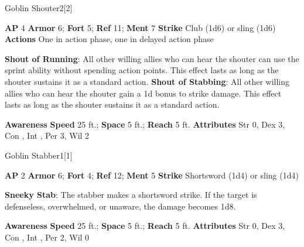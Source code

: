 \begin{monsection}{Goblin Shouter}{2}[2]
\vspace{-1em}\vspace{-1em}
\begin{spellcontent}
\begin{spelltargetinginfo}
{\textbf{AP} 4}
\pari \textbf{Armor} 6;
\textbf{Fort} 5;
\textbf{Ref} 11;
\textbf{Ment} 7
\pari \textbf{Strike} Club  (1d6) or sling  (1d6)
\pari \textbf{Actions} One in action phase, one in delayed action phase
\end{spelltargetinginfo}
\begin{spelleffects}
\pari
\textbf{Shout of Running}:
All other willing allies who can hear the shouter can use the sprint ability without spending action points.
This effect lasts as long as the shouter sustains it as a standard action.
\vspace{0.5em}
\pari
\textbf{Shout of Stabbing}:
All other willing allies who can hear the shouter gain a \plus1d bonus to strike damage.
This effect lasts as long as the shouter sustains it as a standard action.
\end{spelleffects}
\end{spellcontent}
\begin{spellsubcontent}
\begin{spellfooter}
\pari \textbf{Awareness} 
\pari \textbf{Speed} 25 ft.;
\textbf{Space} 5 ft.;
\textbf{Reach} 5 ft.
\pari \textbf{Attributes}
Str 0,
Dex 3,
Con ,
Int ,
Per 3,
Wil 2
\end{spellfooter}
\end{spellsubcontent}
\end{monsection}
\begin{monsection}{Goblin Stabber}{1}[1]
\vspace{-1em}\vspace{-1em}
\begin{spellcontent}
\begin{spelltargetinginfo}
{\textbf{AP} 2}
\pari \textbf{Armor} 6;
\textbf{Fort} 4;
\textbf{Ref} 12;
\textbf{Ment} 5
\pari \textbf{Strike} Shortsword  (1d4) or sling  (1d4)
\end{spelltargetinginfo}
\begin{spelleffects}
\pari
\textbf{Sneeky Stab}:
The stabber makes a shortsword strike.
If the target is defenseless, overwhelmed, or unaware, the damage becomes 1d8.
\end{spelleffects}
\end{spellcontent}
\begin{spellsubcontent}
\begin{spellfooter}
\pari \textbf{Awareness} 
\pari \textbf{Speed} 25 ft.;
\textbf{Space} 5 ft.;
\textbf{Reach} 5 ft.
\pari \textbf{Attributes}
Str 0,
Dex 3,
Con ,
Int ,
Per 2,
Wil 0
\end{spellfooter}
\end{spellsubcontent}
\end{monsection}
